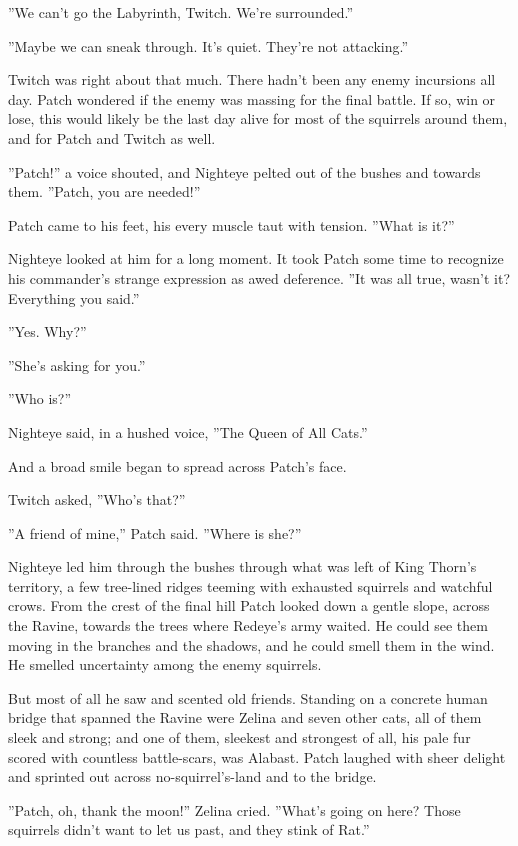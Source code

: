 \documentclass[12pt]{book}
\begin{document}
''We can't go the Labyrinth, Twitch. We're surrounded.''

''Maybe we can sneak through. It's quiet. They're not attacking.''

Twitch was right about that much. There hadn't been any enemy
incursions all day. Patch wondered if the enemy was massing for the
final battle. If so, win or lose, this would likely be the last day
alive for most of the squirrels around them, and for Patch and Twitch
as well.

''Patch!'' a voice shouted, and Nighteye pelted out of the bushes and
towards them. ''Patch, you are needed!''

Patch came to his feet, his every muscle taut with tension. ''What is
it?''

Nighteye looked at him for a long moment. It took Patch some time to
recognize his commander's strange expression as awed deference. ''It
was all true, wasn't it? Everything you said.''

''Yes. Why?''

''She's asking for you.''

''Who is?''

Nighteye said, in a hushed voice, ''The Queen of All Cats.''

And a broad smile began to spread across Patch's face.

Twitch asked, ''Who's that?''

''A friend of mine,'' Patch said. ''Where is she?''

Nighteye led him through the bushes through what was left of King
Thorn's territory, a few tree-lined ridges teeming with exhausted
squirrels and watchful crows. From the crest of the final hill Patch
looked down a gentle slope, across the Ravine, towards the trees where
Redeye's army waited. He could see them moving in the branches and the
shadows, and he could smell them in the wind. He smelled uncertainty
among the enemy squirrels.

But most of all he saw and scented old friends. Standing on a concrete
human bridge that spanned the Ravine were Zelina and seven other cats,
all of them sleek and strong; and one of them, sleekest and strongest
of all, his pale fur scored with countless battle-scars, was
Alabast. Patch laughed with sheer delight and sprinted out across
no-squirrel's-land and to the bridge.

''Patch, oh, thank the moon!'' Zelina cried. ''What's going on here?
Those squirrels didn't want to let us past, and they stink of Rat.''
\end{document}
